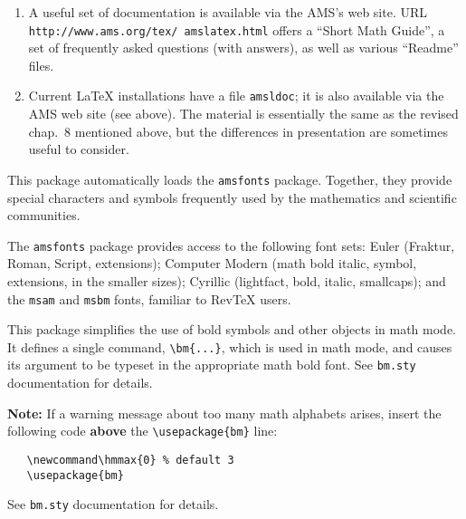 \begin{description}
\begin{enumerate}
      \item A useful set of documentation is available via the {\small
            AMS}'s web site. {\small URL}
            \texttt{http://www.ams.org/tex/ amslatex.html} offers a
            ``Short Math Guide'', a set of frequently asked questions
            (with answers), as well as various ``Readme'' files.
 
      \item Current \LaTeX{} installations have a file
            \texttt{amsldoc}; it is also available via the {\small
            AMS} web site (see above). The material is essentially the
            same as the revised chap.~8 mentioned above, but the
            differences in presentation are sometimes useful to
            consider.
\end{enumerate}

   \item [{\tt \blash usepackage\char`\{amssymb\char`\}}]

         This package automatically loads the 
         \texttt{amsfonts} package. Together, they provide 
         special characters and symbols frequently used by the
         mathematics and scientific communities. 

         The \texttt{amsfonts} package provides access to the
         following font sets: Euler (Fraktur, Roman, Script,
         extensions); Computer Modern (math bold ital\-ic, symbol,
         extensions, in the smaller sizes); Cyrillic (lightfact, bold,
         italic, smallcaps); and the \texttt{msam} and \texttt{msbm}
         fonts, familiar to Rev\TeX{} users.


   \item [{\tt \blash usepackage\char`\{bm\char`\}}] 

         This package simplifies the use of bold symbols and other
         objects in math mode. It defines a single command,
         \verb|\bm{...}|, which is used in math mode, and causes its
         argument to be typeset in the appropriate math bold font.
         See \verb|bm.sty| documentation for details.\label{bm}

         {\bf Note:} If a warning message about too many math
         alphabets arises, insert the following code {\bf above} the
         \verb|\usepackage{bm}| line:

\begin{verbatim}
   \newcommand\hmmax{0} % default 3
   \usepackage{bm}
\end{verbatim}
%
         See \verb|bm.sty| documentation for details.



\end{description}
